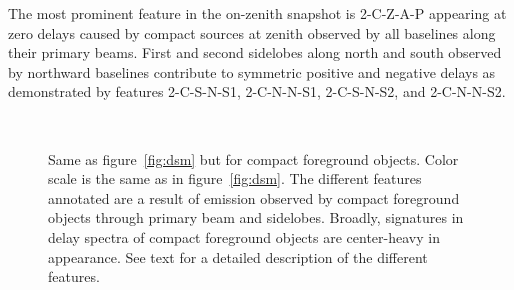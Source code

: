 \documentclass[preprint2,iop,numberedappendix]{emulateapj}
\begin{document}
The most prominent feature in the on-zenith snapshot is 2-C-Z-A-P appearing at zero delays caused by compact sources at zenith observed by all baselines along their primary beams. First and second sidelobes along north and south observed by northward baselines contribute to symmetric positive and negative delays as demonstrated by features 2-C-S-N-S1, 2-C-N-N-S1, 2-C-S-N-S2, and 2-C-N-N-S2.

\begin{figure}[htp]
\centering
{}
\\
\caption{Same as figure~\ref{fig:dsm} but for compact foreground objects. Color scale is the same as in figure~\ref{fig:dsm}. The different features annotated are a result of emission observed by compact foreground objects through primary beam and sidelobes. Broadly, signatures in delay spectra of compact foreground objects are center-heavy in appearance. See text for a detailed description of the different features.}
\label{fig:csm}
\end{figure}
\end{document}
